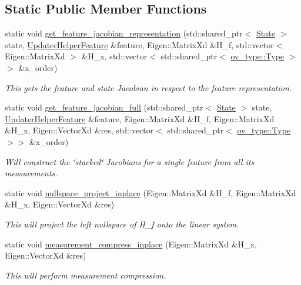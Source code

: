 \subsection*{Static Public Member Functions}
\begin{DoxyCompactItemize}
\item 
static void \hyperlink{classov__msckf_1_1UpdaterHelper_a56158bf8f62681bb1458500589d80aa7}{get\+\_\+feature\+\_\+jacobian\+\_\+representation} (std\+::shared\+\_\+ptr$<$ \hyperlink{classov__msckf_1_1State}{State} $>$ state, \hyperlink{structov__msckf_1_1UpdaterHelper_1_1UpdaterHelperFeature}{Updater\+Helper\+Feature} \&feature, Eigen\+::\+Matrix\+Xd \&H\+\_\+f, std\+::vector$<$ Eigen\+::\+Matrix\+Xd $>$ \&H\+\_\+x, std\+::vector$<$ std\+::shared\+\_\+ptr$<$ \hyperlink{classov__type_1_1Type}{ov\+\_\+type\+::\+Type} $>$$>$ \&x\+\_\+order)
\begin{DoxyCompactList}\small\item\em This gets the feature and state Jacobian in respect to the feature representation. \end{DoxyCompactList}\item 
static void \hyperlink{classov__msckf_1_1UpdaterHelper_a83ba71455395ed13bbd15eb9134a6075}{get\+\_\+feature\+\_\+jacobian\+\_\+full} (std\+::shared\+\_\+ptr$<$ \hyperlink{classov__msckf_1_1State}{State} $>$ state, \hyperlink{structov__msckf_1_1UpdaterHelper_1_1UpdaterHelperFeature}{Updater\+Helper\+Feature} \&feature, Eigen\+::\+Matrix\+Xd \&H\+\_\+f, Eigen\+::\+Matrix\+Xd \&H\+\_\+x, Eigen\+::\+Vector\+Xd \&res, std\+::vector$<$ std\+::shared\+\_\+ptr$<$ \hyperlink{classov__type_1_1Type}{ov\+\_\+type\+::\+Type} $>$$>$ \&x\+\_\+order)
\begin{DoxyCompactList}\small\item\em Will construct the \char`\"{}stacked\char`\"{} Jacobians for a single feature from all its measurements. \end{DoxyCompactList}\item 
static void \hyperlink{classov__msckf_1_1UpdaterHelper_a5cbdb9addf936d5cf101a9a9bda79f3b}{nullspace\+\_\+project\+\_\+inplace} (Eigen\+::\+Matrix\+Xd \&H\+\_\+f, Eigen\+::\+Matrix\+Xd \&H\+\_\+x, Eigen\+::\+Vector\+Xd \&res)
\begin{DoxyCompactList}\small\item\em This will project the left nullspace of H\+\_\+f onto the linear system. \end{DoxyCompactList}\item 
static void \hyperlink{classov__msckf_1_1UpdaterHelper_a45c5fab93318114f765bf29e9e42a3f3}{measurement\+\_\+compress\+\_\+inplace} (Eigen\+::\+Matrix\+Xd \&H\+\_\+x, Eigen\+::\+Vector\+Xd \&res)
\begin{DoxyCompactList}\small\item\em This will perform measurement compression. \end{DoxyCompactList}\end{DoxyCompactItemize}


